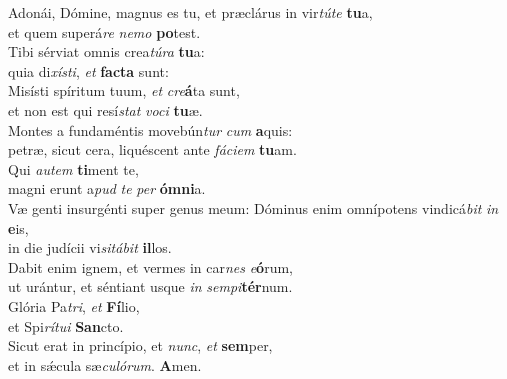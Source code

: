 \evenverse Adonái, Dómine, magnus es tu, et præclárus in vir\textit{tú}\textit{te} \textbf{tu}a,~\*\\
\evenverse et quem superá\textit{re} \textit{ne}\textit{mo} \textbf{po}test.\\
\oddverse Tibi sérviat omnis crea\textit{tú}\textit{ra} \textbf{tu}a:~\*\\
\oddverse quia di\textit{xí}\textit{sti}, \textit{et} \textbf{fa}\textbf{cta} sunt:\\
\evenverse Misísti spíritum tuum, \textit{et} \textit{cre}\textbf{á}ta sunt,~\*\\
\evenverse et non est qui resí\textit{stat} \textit{vo}\textit{ci} \textbf{tu}æ.\\
\oddverse Montes a fundaméntis movebún\textit{tur} \textit{cum} \textbf{a}quis:~\*\\
\oddverse petræ, sicut cera, liquéscent ante \textit{fá}\textit{ci}\textit{em} \textbf{tu}am.\\
\evenverse Qui \textit{au}\textit{tem} \textbf{ti}ment te,~\*\\
\evenverse magni erunt a\textit{pud} \textit{te} \textit{per} \textbf{óm}\textbf{ni}a.\\
\oddverse Væ genti insurgénti super genus meum: Dóminus enim omnípotens vindicá\textit{bit} \textit{in} \textbf{e}is,~\*\\
\oddverse in die judícii vi\textit{si}\textit{tá}\textit{bit} \textbf{il}los.\\
\evenverse Dabit enim ignem, et vermes in car\textit{nes} \textit{e}\textbf{ó}rum,~\*\\
\evenverse ut urántur, et séntiant usque \textit{in} \textit{sem}\textit{pi}\textbf{tér}num.\\
\oddverse Glória Pa\textit{tri}, \textit{et} \textbf{Fí}lio,~\*\\
\oddverse et Spi\textit{rí}\textit{tu}\textit{i} \textbf{San}cto.\\
\evenverse Sicut erat in princípio, et \textit{nunc}, \textit{et} \textbf{sem}per,~\*\\
\evenverse et in sǽcula sæ\textit{cu}\textit{ló}\textit{rum}. \textbf{A}men.\\
